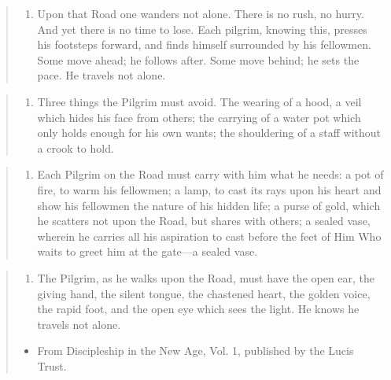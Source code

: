\documentclass[
]{book}
\providecommand{\tightlist}{%
  \setlength{\itemsep}{0pt}\setlength{\parskip}{0pt}}
\begin{document}
\begin{quote}
\begin{enumerate}
\def\labelenumi{\arabic{enumi}.}
\setcounter{enumi}{2}
\tightlist
\item
  Upon that Road one wanders not alone. There is no rush, no hurry. And yet there is no time to lose. Each pilgrim, knowing this, presses his footsteps forward, and finds himself surrounded by his fellowmen. Some move ahead; he follows after. Some move behind; he sets the pace. He travels not alone.
\end{enumerate}
\end{quote}

\begin{quote}
\begin{enumerate}
\def\labelenumi{\arabic{enumi}.}
\setcounter{enumi}{3}
\tightlist
\item
  Three things the Pilgrim must avoid. The wearing of a hood, a veil which hides his face from others; the carrying of a water pot which only holds enough for his own wants; the shouldering of a staff without a crook to hold.
\end{enumerate}
\end{quote}

\begin{quote}
\begin{enumerate}
\def\labelenumi{\arabic{enumi}.}
\setcounter{enumi}{4}
\tightlist
\item
  Each Pilgrim on the Road must carry with him what he needs: a pot of fire, to warm his fellowmen; a lamp, to cast its rays upon his heart and show his fellowmen the nature of his hidden life; a purse of gold, which he scatters not upon the Road, but shares with others; a sealed vase, wherein he carries all his aspiration to cast before the feet of Him Who waits to greet him at the gate---a sealed vase.
\end{enumerate}
\end{quote}

\begin{quote}
\begin{enumerate}
\def\labelenumi{\arabic{enumi}.}
\setcounter{enumi}{5}
\tightlist
\item
  The Pilgrim, as he walks upon the Road, must have the open ear, the giving hand, the silent tongue, the chastened heart, the golden voice, the rapid foot, and the open eye which sees the light. He knows he travels not alone.
\end{enumerate}

\begin{itemize}
\tightlist
\item
  From Discipleship in the New Age, Vol. 1, published by the Lucis Trust.
\end{itemize}
\end{quote}
\end{document}
